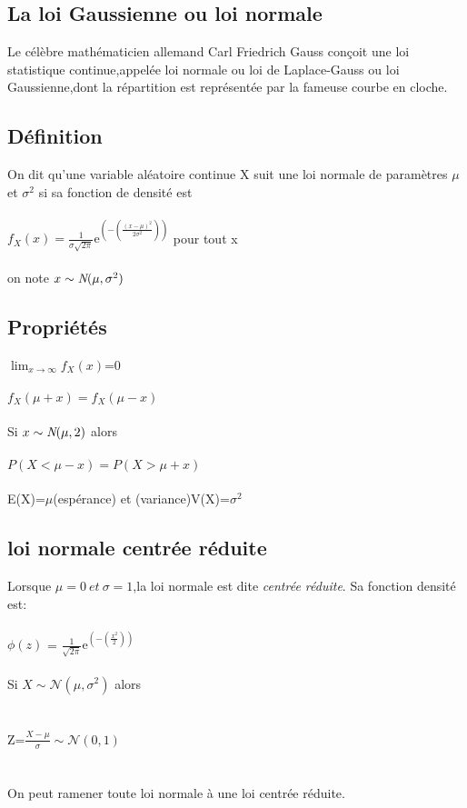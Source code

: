 \documentclass{book}
\begin{document}
      \begin{appendices}
        \chapter{La loi Gaussienne ou loi normale}
        	  
         Le célèbre mathématicien allemand Carl Friedrich Gauss conçoit une loi statistique continue,appelée loi normale ou loi de Laplace-Gauss ou loi Gaussienne,dont la répartition est représentée par la fameuse courbe en cloche.
        	\section{Définition}
        	On dit qu'une variable aléatoire continue X suit une loi normale de paramètres $\mu$ et $\sigma^2$ si sa fonction de densité est \\\\$f_X(x)=\frac{1}{\sigma \sqrt{2\pi}}\mathrm{e}^(-(\frac{(x-\mu)^2}{2\sigma^2}))$ pour tout x\\\\
        	on note $x\sim\emph{N}(\mu,\sigma^2)$
        	\section{Propriétés}
        	$\lim_{x \to\infty}f_X(x)$=0\\\\$f_X(\mu + x) = f_X(\mu - x)$\\\\
        	Si $x\sim\emph{N}(\mu,2)$ alors\\\\$P(X < \mu -x)= P(X > \mu +x)$\\\\ E(X)=$\mu$(espérance) et (variance)V(X)=$\sigma^2$
        	\newpage
        	\section{loi normale centrée réduite}
        	Lorsque $\mu=0\ et\ \sigma=1$,la loi normale est dite \emph{centrée réduite}.
        	Sa fonction densité est:
        	  \\\\$\phi(z)$ = $\frac{1}{\sqrt{2\pi}}\mathrm{e}^(-(\frac{x^2}{2}))$ \\\\Si $X\sim\mathcal{N}(\mu,\sigma^2)$ alors\\\\\\Z=$\frac{X-\mu}{\sigma}\sim \mathcal{N}(0,1)$\\\\\\On peut ramener toute loi normale à une loi centrée réduite.
   

\end{appendices}
\end{document}
